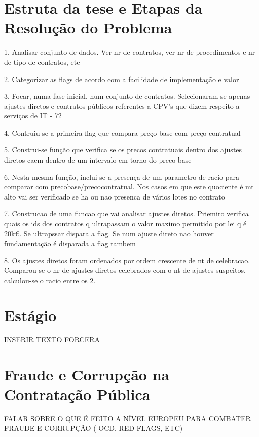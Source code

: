 \section{Estruta da tese e   Etapas da Resolução do Problema}

1. Analisar conjunto de dados. Ver nr de contratos, ver nr de procedimentos e nr de tipo de contratos, etc

2. Categorizar as flags de acordo com a facilidade de implementação e valor

3. Focar, numa fase inicial, num conjunto de contratos. Selecionaram-se apenas ajustes diretos e contratos públicos referentes a CPV's que dizem respeito a serviços de IT - 72

4. Contruiu-se a primeira flag que compara preço base com preço contratual 

5. Construi-se função que verifica se os precos contratuais dentro dos ajustes diretos caem dentro de um intervalo em torno do preco base

6. Nesta mesma função, inclui-se a presença de um parametro de racio para comparar com precobase/precocontratual. Nos casos em que este quociente é mt alto vai ser verificado se ha ou nao presenca de vários lotes no contrato

7. Construcao de uma funcao que vai analisar ajustes diretos. Priemiro verifica quais os ids dos contratos q ultrapassam o valor maximo permitido por lei q é 20k€. Se ultrapssar dispara a flag. Se num ajuste direto nao houver fundamentação é disparada a flag tambem

8. Os ajustes diretos foram ordenados por ordem crescente de nt de celebracao. Comparou-se o nr de ajustes diretos celebrados com o nt de ajustes suspeitos, calculou-se o racio entre os 2. 



\section{Estágio}

INSERIR TEXTO FORCERA

\section{Fraude e Corrupção na Contratação Pública}

FALAR SOBRE O QUE É FEITO A NÍVEL EUROPEU PARA COMBATER FRAUDE E CORRUPÇÃO ( OCD, RED FLAGS, ETC)
\\
\\


